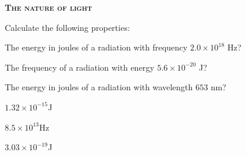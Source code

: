 \documentclass[main.tex]{subfiles}
\begin{document}
\newpage
\setdoublesep{0.35700 em}  %
\setatomsep{1.78500 em}    %
\setbondoffset{0.18265 em} %
\newcommand{\bondwidth}{0.06642 em} %
\setbondstyle{line width = \bondwidth}
\fancyhfoffset[E,O]{0pt}
\setlength{\columnsep}{30pt}
\begin{conclusion}
\end{conclusion}
\begin{multicols*}{2}\setcounter{numA}{1}  %


{\raggedright\textsc{\textbf{The nature of light}}\par}

\begin{question}[ID=\the\value{numA}]
Calculate the following properties:
\begin{inparaenum}[(a)]
\item  The energy in joules of a radiation with frequency $2.0\times10^{18}$ Hz?
\item  The frequency of a radiation with energy $5.6\times10^{-20}$ J?
 \item   The energy in joules of a radiation with wavelength $653$ nm?
\end{inparaenum}
\end{question}
\begin{solution}
\begin{inparaenum}[(a)]
\item  $1.32\times10^{-15}$J
\item  $8.5\times10^{13}$Hz
\item   $3.03\times10^{-19}$J
\end{inparaenum}\hspace{0.1cm}\end{solution}


\end{multicols*}
\end{document}
